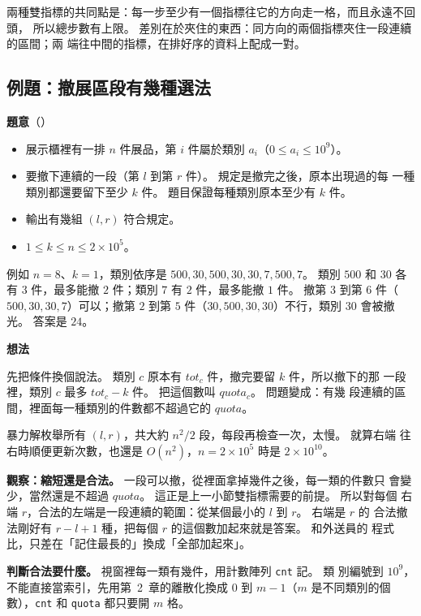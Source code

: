 兩種雙指標的共同點是：每一步至少有一個指標往它的方向走一格，而且永遠不回頭，
所以總步數有上限。 差別在於夾住的東西：同方向的兩個指標夾住一段連續的區間；兩
端往中間的指標，在排好序的資料上配成一對。

\subsection{例題：撤展區段有幾種選法}
\label{sec:ps-ex-clear}

\textbf{題意}（）

\begin{itemize}
\item 展示櫃裡有一排 $n$ 件展品，第 $i$ 件屬於類別 $a_i$（$0 \le a_i \le
10^9$）。
\item 要撤下連續的一段（第 $l$ 到第 $r$ 件）。 規定是撤完之後，原本出現過的每
一種類別都還要留下至少 $k$ 件。 題目保證每種類別原本至少有 $k$ 件。
\item 輸出有幾組 $(l, r)$ 符合規定。
\item $1 \le k \le n \le 2 \times 10^5$。
\end{itemize}

例如 $n = 8$、$k = 1$，類別依序是 $500, 30, 500, 30, 30, 7, 500, 7$。 類別
$500$ 和 $30$ 各有 $3$ 件，最多能撤 $2$ 件；類別 $7$ 有 $2$ 件，最多能撤 $1$
件。 撤第 $3$ 到第 $6$ 件（$500, 30, 30, 7$）可以；撤第 $2$ 到第 $5$ 件（$30,
500, 30, 30$）不行，類別 $30$ 會被撤光。 答案是 $24$。

\textbf{想法}

先把條件換個說法。 類別 $c$ 原本有 $tot_c$ 件，撤完要留 $k$ 件，所以撤下的那
一段裡，類別 $c$ 最多 $tot_c - k$ 件。 把這個數叫 $quota_c$。 問題變成：有幾
段連續的區間，裡面每一種類別的件數都不超過它的 $quota$。

暴力解枚舉所有 $(l, r)$，共大約 $n^2 / 2$ 段，每段再檢查一次，太慢。 就算右端
往右時順便更新次數，也還是 $O(n^2)$，$n = 2 \times 10^5$ 時是 $2 \times 10^{10}$。

\textbf{觀察：縮短還是合法。} 一段可以撤，從裡面拿掉幾件之後，每一類的件數只
會變少，當然還是不超過 $quota$。 這正是上一小節雙指標需要的前提。 所以對每個
右端 $r$，合法的左端是一段連續的範圍：從某個最小的 $l$ 到 $r$。 右端是 $r$ 的
合法撤法剛好有 $r - l + 1$ 種，把每個 $r$ 的這個數加起來就是答案。 和外送員的
程式比，只差在「記住最長的」換成「全部加起來」。

\textbf{判斷合法要什麼。} 視窗裡每一類有幾件，用計數陣列 \texttt{cnt} 記。 類
別編號到 $10^9$，不能直接當索引，先用第~2~章的離散化換成 $0$ 到 $m - 1$（$m$
是不同類別的個數），\texttt{cnt} 和 \texttt{quota} 都只要開 $m$ 格。

